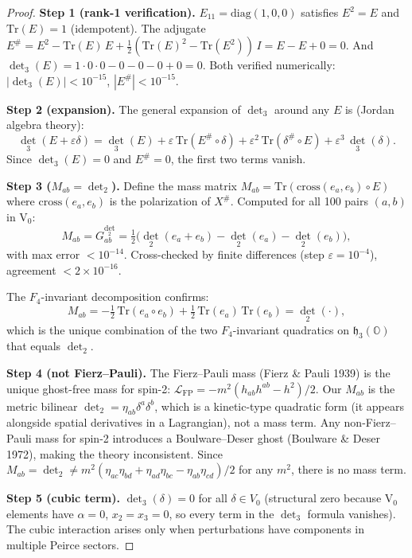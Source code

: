 \documentclass[11pt]{article}
\newcommand{\Tr}{\mathrm{Tr}}
\newcommand{\h}{\mathfrak{h}}
\begin{document}
\begin{proof}
\textbf{Step 1 (rank-1 verification).}
$E_{11} = \mathrm{diag}(1,0,0)$ satisfies $E^2 = E$ and $\Tr(E) = 1$
(idempotent). The adjugate $E^\# = E^2 - \Tr(E)\,E + \tfrac{1}{2}(\Tr(E)^2 - \Tr(E^2))\,I
= E - E + 0 = 0$. And $\det_3(E) = 1 \cdot 0 \cdot 0 - 0 - 0 - 0 + 0 = 0$.
Both verified numerically: $|\det_3(E)| < 10^{-15}$, $|E^\#| < 10^{-15}$.

\textbf{Step 2 (expansion).}
The general expansion of $\det_3$ around any $E$ is (Jordan algebra theory):
\[
  \det_3(E + \varepsilon\delta)
  = \det_3(E) + \varepsilon\,\Tr(E^\# \circ \delta)
    + \varepsilon^2\,\Tr(\delta^\# \circ E)
    + \varepsilon^3\,\det_3(\delta).
\]
Since $\det_3(E) = 0$ and $E^\# = 0$, the first two terms vanish.

\textbf{Step 3 ($M_{ab} = \det_2$).}
Define the mass matrix $M_{ab} = \Tr(\mathrm{cross}(e_a, e_b) \circ E)$
where $\mathrm{cross}(e_a, e_b)$ is the polarization of $X^\#$. Computed
for all 100 pairs $(a,b)$ in V$_0$:
\begin{equation}\label{eq:50.7}
  M_{ab} = G^{\det_2}_{ab} = \tfrac{1}{2}\bigl(\det_2(e_a + e_b)
    - \det_2(e_a) - \det_2(e_b)\bigr),
\end{equation}
with max error $< 10^{-14}$. Cross-checked by finite differences
(step $\varepsilon = 10^{-4}$), agreement $< 2 \times 10^{-16}$.

The $F_4$-invariant decomposition confirms:
\begin{equation}\label{eq:50.8}
  M_{ab} = -\tfrac{1}{2}\,\Tr(e_a \circ e_b) + \tfrac{1}{2}\,\Tr(e_a)\,\Tr(e_b)
  = \det_2(\cdot),
\end{equation}
which is the unique combination of the two $F_4$-invariant quadratics on
$\h_3(\mathbb{O})$ that equals $\det_2$.

\textbf{Step 4 (not Fierz--Pauli).}
The Fierz--Pauli mass (Fierz \& Pauli 1939) is the unique ghost-free mass
for spin-2: $\mathcal{L}_{\mathrm{FP}} = -m^2(h_{ab}h^{ab} - h^2)/2$.
Our $M_{ab}$ is the metric bilinear $\det_2 = \eta_{ab}\delta^a\delta^b$,
which is a kinetic-type quadratic form (it appears alongside spatial
derivatives in a Lagrangian), not a mass term. Any non-Fierz--Pauli
mass for spin-2 introduces a Boulware--Deser ghost
(Boulware \& Deser 1972), making the theory inconsistent.
Since $M_{ab} = \det_2 \neq m^2(\eta_{ac}\eta_{bd} + \eta_{ad}\eta_{bc}
- \eta_{ab}\eta_{cd})/2$ for any $m^2$, there is no mass term.

\textbf{Step 5 (cubic term).}
$\det_3(\delta) = 0$ for all $\delta \in V_0$ (structural zero because
V$_0$ elements have $\alpha = 0$, $x_2 = x_3 = 0$, so every term in the
$\det_3$ formula vanishes). The cubic interaction arises only when
perturbations have components in multiple Peirce sectors.
\end{proof}
\end{document}

